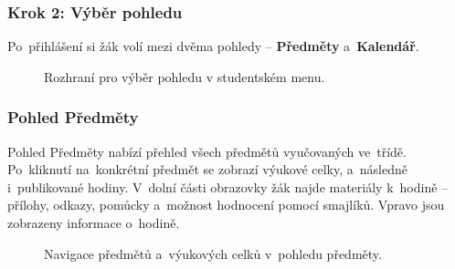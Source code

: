 \documentclass[male,czech,api_bc]{kitheses}
\begin{document}
\subsubsection{Krok 2: Výběr pohledu}
Po~přihlášení si žák volí mezi dvěma pohledy – \textbf{Předměty} a~\textbf{Kalendář}.

\begin{figure}[H]
	\centering
	\caption{Rozhraní pro výběr pohledu v studentském menu.}
	\label{fig:manual-6}
\end{figure}

\subsubsection{Pohled Předměty}
Pohled Předměty nabízí přehled všech předmětů vyučovaných ve~třídě. Po~kliknutí na~konkrétní předmět se zobrazí výukové celky, a~následně i~publikované hodiny. V~dolní části obrazovky žák najde materiály k~hodině – přílohy, odkazy, pomůcky a~možnost hodnocení pomocí smajlíků. Vpravo jsou zobrazeny informace o~hodině.

\begin{figure}[H]
	\centering
	\caption{Navigace předmětů a~výukových celků v~pohledu předměty.}
	\label{fig:manual-7}
\end{figure}
\end{document}
